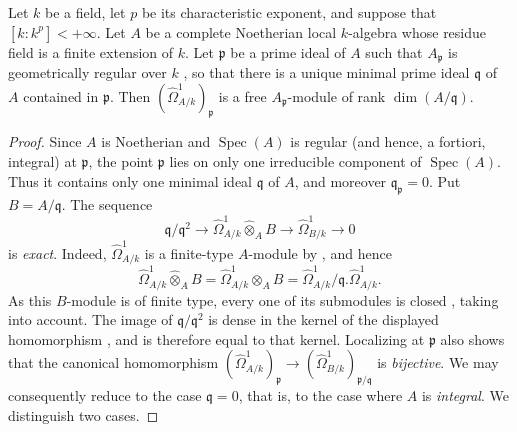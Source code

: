\begin{lemma}[18.11.3]
\label{IV.18.11.3}
Let $k$ be a field, let $p$ be its characteristic exponent, and suppose that $[k:k^p]<+\infty$. Let $A$ be a \textup{complete} Noetherian local $k$-algebra whose residue field is a \textup{finite} extension of $k$. Let $\mathfrak{p}$ be a prime ideal of $A$ such that $A_{\mathfrak{p}}$ is \textup{geometrically regular} over $k$ , so that there is a unique minimal prime ideal $\mathfrak{q}$ of $A$ contained in $\mathfrak{p}$. Then $(\hat{\Omega}^1_{A/k})_{\mathfrak{p}}$ is a free $A_{\mathfrak{p}}$-module of rank $\dim(A/\mathfrak{q})$.
\end{lemma}

\begin{proof}
Since $A$ is Noetherian and $\operatorname{Spec}(A)$ is regular (and hence, a fortiori, integral) at $\mathfrak{p}$, the point $\mathfrak{p}$ lies on only one irreducible component of $\operatorname{Spec}(A)$. Thus it contains
only one minimal ideal $\mathfrak{q}$ of $A$, and moreover $\mathfrak{q}_{\mathfrak{p}}=0$. Put $B=A/\mathfrak{q}$. The sequence 
\[
  \mathfrak{q}/\mathfrak{q}^2\longrightarrow
  \hat{\Omega}^1_{A/k}\widehat{\otimes}_{A}B
  \longrightarrow\hat{\Omega}^1_{B/k}\longrightarrow0
\]
is \emph{exact}. Indeed, $\hat{\Omega}^1_{A/k}$ is a finite-type $A$-module by , and hence
\[
  \hat{\Omega}^1_{A/k}\widehat{\otimes}_{A}B
  =\hat{\Omega}^1_{A/k}\otimes_{A}B
  =\hat{\Omega}^1_{A/k}/\mathfrak{q}.\hat{\Omega}^1_{A/k}.
\]
As this $B$-module is of finite type, every one of its submodules is closed , taking  into account. The image of $\mathfrak{q}/\mathfrak{q}^2$ is dense in the kernel of the displayed homomorphism , and is therefore equal to that kernel. Localizing at $\mathfrak{p}$ also shows that the canonical homomorphism $(\hat{\Omega}^1_{A/k})_{\mathfrak{p}}\to(\hat{\Omega}^1_{B/k})_{\mathfrak{p}/\mathfrak{q}}$ is \emph{bijective}. We may consequently reduce to the case $\mathfrak{q}=0$, that is, to the case where $A$ is \emph{integral}. We distinguish two cases.


\end{proof}
